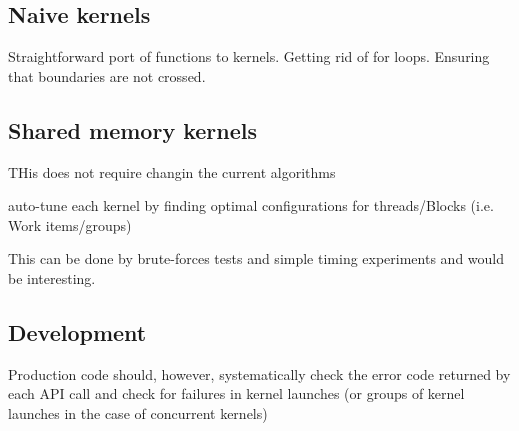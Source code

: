 \subsection{Naive kernels}
Straightforward port of functions to kernels. Getting rid of for loops. Ensuring that boundaries are not crossed.


\subsection{Shared memory kernels}

THis does not require changin the current algorithms

auto-tune each kernel by finding optimal
configurations for threads/Blocks (i.e. Work items/groups) 

 This can be done by brute-forces tests and simple timing
experiments and would be interesting.

\subsection{Development}
Production code should, however, systematically check the error code returned by each API call and check for failures in kernel launches (or groups of kernel launches in the case of concurrent kernels) 